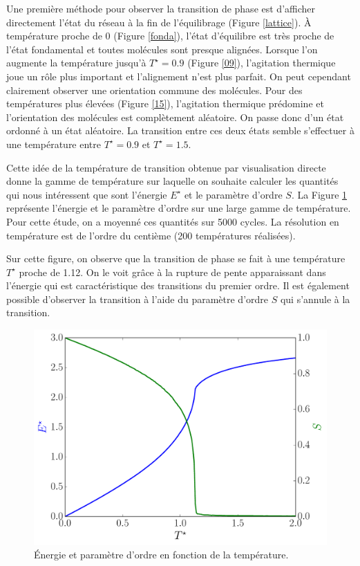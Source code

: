 \documentclass[11pt,a4paper]{article}
\numberwithin{equation}{section}
\begin{document}
Une première méthode pour observer la transition de phase est d'afficher directement l'état du réseau à la fin de l'équilibrage (Figure \ref{lattice}). À température proche de 0 (Figure \ref{fonda}), l'état d'équilibre est très proche de l'état fondamental et toutes molécules sont presque alignées. Lorsque l'on augmente la température jusqu'à $T^\star = 0.9$ (Figure \ref{09}), l'agitation thermique joue un rôle plus important et l'alignement n'est plus parfait. On peut cependant clairement observer une orientation commune des molécules. Pour des températures plus élevées (Figure \ref{15}), l'agitation thermique prédomine et l'orientation des molécules est complètement aléatoire.
On passe donc d'un état ordonné à un état aléatoire. La transition entre ces deux états semble s'effectuer à une température entre $T^\star = 0.9$ et $T^\star = 1.5$. 
\medskip

Cette idée de la température de transition obtenue par visualisation directe donne la gamme de température sur laquelle on souhaite calculer les quantités qui nous intéressent que sont l'énergie $E^\star$ et le paramètre d'ordre $S$. La Figure \ref{global} représente l'énergie et le paramètre d'ordre sur une large gamme de température. Pour cette étude, on a moyenné ces quantités sur 5000 cycles. La résolution en température est de l'ordre du centième (200 températures réalisées).
\medskip

Sur cette figure, on observe que la transition de phase se fait à une température $T^\star$ proche de 1.12. On le voit grâce à la rupture de pente apparaissant dans l'énergie qui est caractéristique des transitions du premier ordre. Il est également possible d'observer la transition à l'aide du paramètre d'ordre $S$ qui s'annule à la transition.

\begin{figure}[h!]
    \centering	    
	\includegraphics[scale=0.6]{figures/global.pdf}
    \caption{Énergie et paramètre d'ordre en fonction de la température.}
    	\label{global} 
\end{figure}
\end{document}
